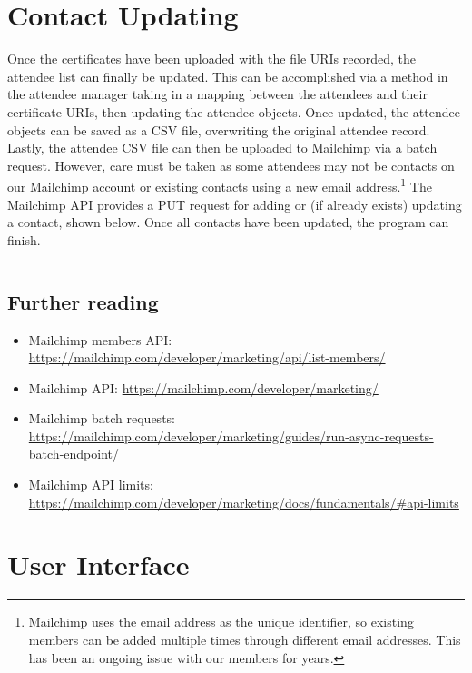 \documentclass[11pt]{article}
\begin{document}
\newpage

\section{Contact Updating}

Once the certificates have been uploaded with the file URIs recorded, the attendee list can finally be updated. This can be accomplished via a method in the attendee manager taking in a mapping between the attendees and their certificate URIs, then updating the attendee objects. Once updated, the attendee objects can be saved as a CSV file, overwriting the original attendee record. Lastly, the attendee CSV file can then be uploaded to Mailchimp via a batch request. However, care must be taken as some attendees may not be contacts on our Mailchimp account or existing contacts using a new email address.\footnote{Mailchimp uses the email address as the unique identifier, so existing members can be added multiple times through different email addresses. This has been an ongoing issue with our members for years.} The Mailchimp API provides a PUT request for adding or (if already exists) updating a contact, shown below. Once all contacts have been updated, the program can finish.

\inputminted[linenos=true]{python}{mailchimp_examples/add_or_update_member.py}

\subsection{Further reading}

\begin{itemize}
    \item Mailchimp members API: \url{https://mailchimp.com/developer/marketing/api/list-members/}
    \item Mailchimp API: \url{https://mailchimp.com/developer/marketing/}
    \item Mailchimp batch requests: \url{https://mailchimp.com/developer/marketing/guides/run-async-requests-batch-endpoint/}
    \item Mailchimp API limits: \url{https://mailchimp.com/developer/marketing/docs/fundamentals/#api-limits}
\end{itemize}

\newpage

\section{User Interface}
\end{document}
